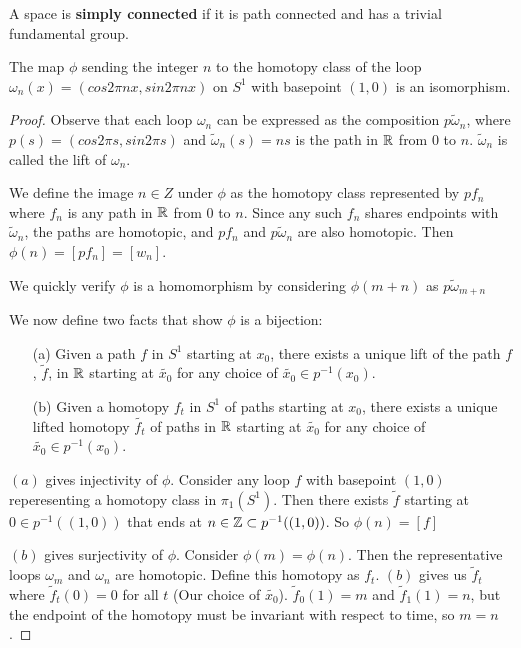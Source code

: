 \documentclass[10pt]{article}
\begin{document}
\begin{definition}
	A space is \textbf{simply connected} if it is path connected and has a trivial fundamental group.
\end{definition}


\begin{theorem}[$\Z \cong \pi(S1)$]

The map $\phi$ sending the integer $n$ to the homotopy class of the loop $\omega_n(x) = (cos2\pi nx, sin2\pi nx)$ on $S^1$ with basepoint $(1, 0)$ is an isomorphism.

\end{theorem}

\begin{proof}

Observe that each loop $\omega_n$ can be expressed as the composition $p\tilde{\omega}_n$, where $p(s) = (cos2\pi s, sin2\pi s)$ and $\tilde{\omega}_n(s) = ns$ is the path in $\mathbb{R}$ from $0$ to $n$. $\tilde{\omega}_n$ is called the lift of $\omega_n$.

We define the image $n \in Z$ under $\phi$ as the homotopy class represented by $pf_n$ where $f_n$ is any path in $\mathbb{R}$ from $0$ to $n$. Since any such $f_n$ shares endpoints with $\tilde{\omega}_n$, the paths are homotopic, and $pf_n$ and $p\tilde{\omega}_n$ are also homotopic. Then $\phi(n) = [pf_n] = [w_n]$.

We quickly verify $\phi$ is a homomorphism by considering $\phi(m + n)$ as $p\tilde{\omega}_{m+n}$

We now define two facts that show $\phi$ is a bijection:
\begin{itemize}
	\item[(a)]Given a path $f$ in $S^1$ starting at $x_0$, there exists a unique lift of the path $f$, $\tilde{f}$, in $\mathbb{R}$ starting at $\tilde{x_0}$ for any choice of $\tilde{x_0} \in p^{-1}{(x_0)}$.
	\item[(b)]Given a homotopy $f_t$ in $S^1$ of paths starting at $x_0$, there exists a unique lifted homotopy $\tilde{f_t}$ of paths in $\mathbb{R}$ starting at $\tilde{x_0}$ for any choice of $\tilde{x_0} \in p^{-1}{(x_0)}$.
\end{itemize}

$(a)$ gives injectivity of $\phi$. Consider any loop $f$ with basepoint $(1, 0)$ reperesenting a homotopy class in $\pi_1(S^1)$. Then there exists $\tilde{f}$ starting at $0 \in p^{-1}((1, 0))$ that ends at $n \in \mathbb{Z} \subset p^{-1}((1, 0))$. So $\phi(n) = [f]$

$(b)$ gives surjectivity of $\phi$. Consider $\phi(m) = \phi(n)$. Then the representative loops $\omega_m$ and $\omega_n$ are homotopic. Define this homotopy as $f_t$. $(b)$ gives us $\tilde{f}_t$ where $\tilde{f}_t(0) = 0$ for all $t$ (Our choice of $\tilde{x_0}$). $\tilde{f}_0(1) = m$ and $\tilde{f}_1(1) = n$, but the endpoint of the homotopy must be invariant with respect to time, so $m = n$.


\end{proof}
\end{document}

